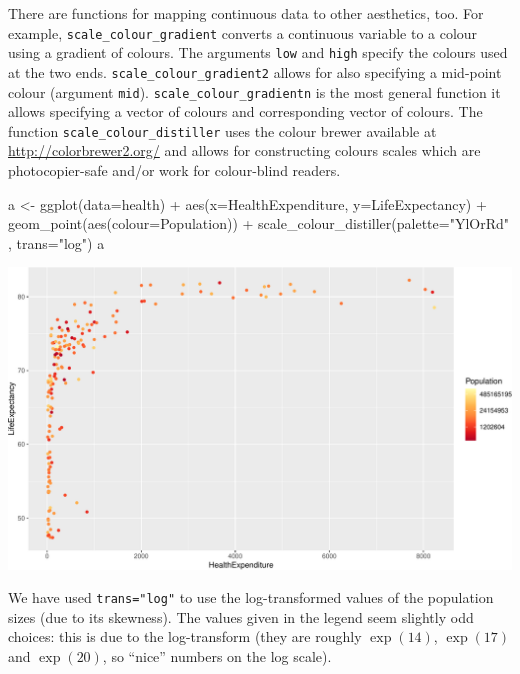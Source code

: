 \documentclass[
]{book}
\newenvironment{Shaded}{\begin{snugshade}}{\end{snugshade}}
\newcommand{\AttributeTok}[1]{\textcolor[rgb]{0.77,0.63,0.00}{#1}}
\newcommand{\FunctionTok}[1]{\textcolor[rgb]{0.00,0.00,0.00}{#1}}
\newcommand{\NormalTok}[1]{#1}
\newcommand{\OtherTok}[1]{\textcolor[rgb]{0.56,0.35,0.01}{#1}}
\newcommand{\SpecialCharTok}[1]{\textcolor[rgb]{0.00,0.00,0.00}{#1}}
\newcommand{\StringTok}[1]{\textcolor[rgb]{0.31,0.60,0.02}{#1}}
\begin{document}
There are functions for mapping continuous data to other aesthetics, too. For example, \texttt{scale\_colour\_gradient} converts a continuous variable to a colour using a gradient of colours. The arguments \texttt{low} and \texttt{high} specify the colours used at the two ends. \texttt{scale\_colour\_gradient2} allows for also specifying a mid-point colour (argument \texttt{mid}). \texttt{scale\_colour\_gradientn} is the most general function it allows specifying a vector of colours and corresponding vector of colours. The function \texttt{scale\_colour\_distiller} uses the colour brewer available at \href{colorbrewer.org}{http://colorbrewer2.org/} and allows for constructing colours scales which are photocopier-safe and/or work for colour-blind readers.

\begin{Shaded}
\begin{Highlighting}[]
\NormalTok{a }\OtherTok{\textless{}{-}} \FunctionTok{ggplot}\NormalTok{(}\AttributeTok{data=}\NormalTok{health) }\SpecialCharTok{+}
         \FunctionTok{aes}\NormalTok{(}\AttributeTok{x=}\NormalTok{HealthExpenditure, }\AttributeTok{y=}\NormalTok{LifeExpectancy) }\SpecialCharTok{+}
         \FunctionTok{geom\_point}\NormalTok{(}\FunctionTok{aes}\NormalTok{(}\AttributeTok{colour=}\NormalTok{Population)) }\SpecialCharTok{+}
         \FunctionTok{scale\_colour\_distiller}\NormalTok{(}\AttributeTok{palette=}\StringTok{"YlOrRd"}\NormalTok{ , }\AttributeTok{trans=}\StringTok{"log"}\NormalTok{)}
\NormalTok{a}
\end{Highlighting}
\end{Shaded}

\includegraphics[width=\textwidth]{bookdown-demo_files/figure-latex/unnamed-chunk-61-1}

We have used \texttt{trans="log"} to use the log-transformed values of the population sizes (due to its skewness). The values given in the legend seem slightly odd choices: this is due to the log-transform (they are roughly \(\exp(14)\), \(\exp(17)\) and \(\exp(20)\), so ``nice'' numbers on the log scale).
\end{document}
